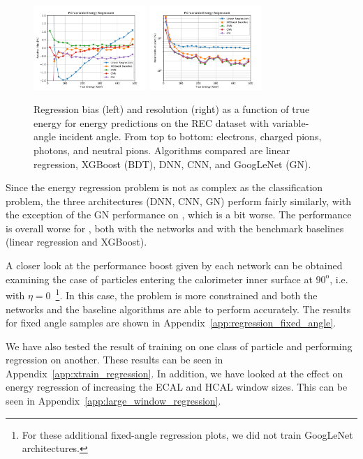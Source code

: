 \begin{figure}[htbp]
\includegraphics[width=0.38\textwidth]{Images/Calo/bias_vs_E_Pi0_variable.pdf}
\includegraphics[width=0.38\textwidth]{Images/Calo/res_vs_E_Pi0_variable.pdf}
\caption{Regression bias (left) and resolution (right) as a function
  of true energy for energy predictions on the REC dataset with
  variable-angle incident angle. From top to bottom: electrons,
  charged pions, photons, and neutral
  pions. Algorithms compared are linear regression, XGBoost (BDT), DNN, CNN, and GoogLeNet (GN).\label{fig:reg_dnn_vs_cnn_variable}}
\end{figure}

Since the energy regression problem is not as complex as the classification problem, the three architectures (DNN, CNN, GN) perform fairly similarly, with the exception of the GN performance on \chpi, which is a bit worse.
The performance is overall worse for \chpi, both with the networks and with the benchmark baselines (linear regression and XGBoost).

A closer look at the performance boost given by each network can be obtained examining the case of particles entering the calorimeter inner surface at $90^{\mathrm o}$, i.e. with $\eta=0$~\footnote{For these additional fixed-angle regression plots, we did not train GoogLeNet architectures.}. In this case, the problem is more constrained and both the networks and the baseline algorithms are able to perform accurately. The results for fixed angle samples are shown in Appendix~\ref{app:regression_fixed_angle}.

We have also tested the result of training on one class of particle and performing regression on another. These results can be seen in Appendix~\ref{app:xtrain_regression}. In addition, we have looked at the effect on energy regression of increasing the ECAL and HCAL window sizes. This can be seen in Appendix~\ref{app:large_window_regression}.

